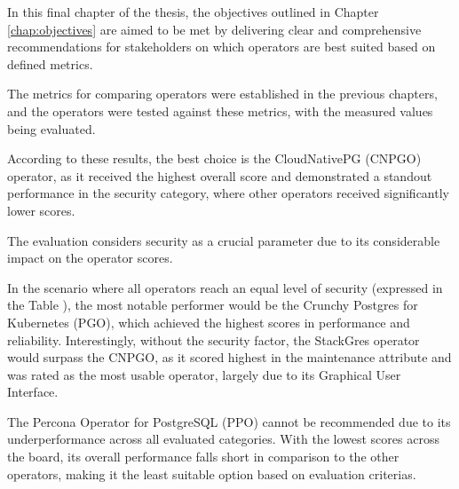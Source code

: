 
In this final chapter of the thesis, the objectives outlined in Chapter \ref{chap:objectives} are aimed to be met by delivering clear and comprehensive recommendations for stakeholders on which operators are best suited based on defined metrics.

The metrics for comparing operators were established in the previous chapters, and the operators were tested against these metrics, with the measured values being evaluated.

According to these results, the best choice is the CloudNativePG (CNPGO) operator, as it received the highest overall score and demonstrated a standout performance in the security category, where other operators received significantly lower scores.

The evaluation considers security as a crucial parameter due to its considerable impact on the operator scores.

In the scenario where all operators reach an equal level of security (expressed in the Table ), the most notable performer would be the Crunchy Postgres for Kubernetes (PGO), which achieved the highest scores in performance and reliability. Interestingly, without the security factor, the StackGres operator would surpass the CNPGO, as it scored highest in the maintenance attribute and was rated as the most usable operator, largely due to its Graphical User Interface.

The Percona Operator for PostgreSQL (PPO) cannot be recommended due to its underperformance across all evaluated categories. With the lowest scores across the board, its overall performance falls short in comparison to the other operators, making it the least suitable option based on evaluation criterias.






